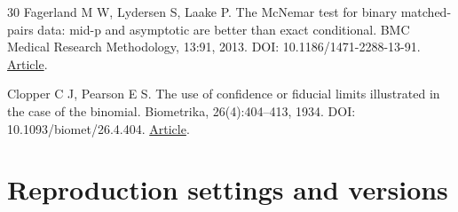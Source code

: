\documentclass[11pt,a4paper]{article}
\begin{document}
\begin{thebibliography}{30}
Fagerland M W, Lydersen S, Laake P. The McNemar test for binary matched-pairs data: mid-p and asymptotic are better than exact conditional. BMC Medical Research Methodology, 13:91, 2013. DOI: 10.1186/1471-2288-13-91. \href{https://link.springer.com/article/10.1186/1471-2288-13-91}{Article}.

Clopper C J, Pearson E S. The use of confidence or fiducial limits illustrated in the case of the binomial. Biometrika, 26(4):404--413, 1934. DOI: 10.1093/biomet/26.4.404. \href{https://academic.oup.com/biomet/article-abstract/26/4/404/291538}{Article}.

\end{thebibliography}

\clearpage

\appendix

\setcounter{table}{0}

\renewcommand{\thetable}{A\arabic{table}}

\section{Reproduction settings and versions}
\end{document}
